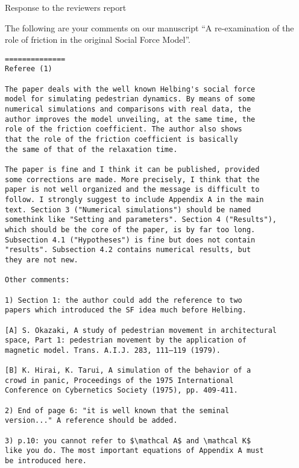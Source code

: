 \documentclass[a4paper,12pt]{letter}
\begin{document}

\begin{letter}{Response to the reviewers report}

\opening{}

The following are your comments on our manuscript ``A re-examination of the role 
of friction in the original Social Force Model''. 



\begin{verbatim}
==============
Referee (1)

The paper deals with the well known Helbing's social force 
model for simulating pedestrian dynamics. By means of some 
numerical simulations and comparisons with real data, the 
author improves the model unveiling, at the same time, the 
role of the friction coefficient. The author also shows 
that the role of the friction coefficient is basically 
the same of that of the relaxation time.

The paper is fine and I think it can be published, provided 
some corrections are made. More precisely, I think that the 
paper is not well organized and the message is difficult to 
follow. I strongly suggest to include Appendix A in the main 
text. Section 3 ("Numerical simulations") should be named 
somethink like "Setting and parameters". Section 4 ("Results"),
which should be the core of the paper, is by far too long. 
Subsection 4.1 ("Hypotheses") is fine but does not contain 
"results". Subsection 4.2 contains numerical results, but 
they are not new.

Other comments:

1) Section 1: the author could add the reference to two 
papers which introduced the SF idea much before Helbing.

[A] S. Okazaki, A study of pedestrian movement in architectural
space, Part 1: pedestrian movement by the application of 
magnetic model. Trans. A.I.J. 283, 111–119 (1979).

[B] K. Hirai, K. Tarui, A simulation of the behavior of a 
crowd in panic, Proceedings of the 1975 International 
Conference on Cybernetics Society (1975), pp. 409-411.

2) End of page 6: "it is well known that the seminal 
version..." A reference should be added.

3) p.10: you cannot refer to $\mathcal A$ and \mathcal K$ 
like you do. The most important equations of Appendix A must 
be introduced here.


\end{verbatim}
\end{letter}
\end{document}
